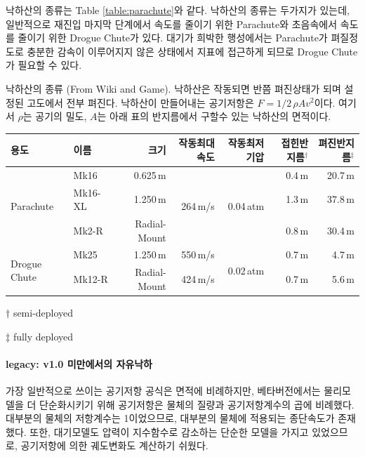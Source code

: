 \documentclass[9pt]{amsbook}
\begin{document}
낙하산의 종류는 Table \ref{table:parachute}와 같다. 낙하산의 종류는 두가지가 있는데, 일반적으로 재진입 마지막 단계에서 속도를 줄이기 위한 Parachute와 초음속에서 속도를 줄이기 위한 Drogue Chute가 있다. 대기가 희박한 행성에서는 Parachute가 펴질정도로 충분한 감속이 이루어지지 않은 상태에서 지표에 접근하게 되므로 Drogue Chute가 필요할 수 있다.

\begin{center}
\begin{adjustbox}{width=\textwidth}
\begin{threeparttable}
\caption{
낙하산의 종류
(From Wiki and Game). 
낙하산은 작동되면 반쯤 펴진상태가 되며 설정된 고도에서 전부 펴진다. 
낙하산이 만들어내는 공기저항은 $F = 1/2 \,\rho A v^2$이다. 
여기서 $\rho$는 공기의 밀도, $A$는 아래 표의 반지름에서 구할수 있는 낙하산의 면적이다.}
\label{table:parachute}
\begin{tabular}{|l|l|r|r|r|r|r|}
\hline
용도&이름&크기&작동최대속도&작동최저기압&접힌반지름$^\dagger$&펴진반지름$^\ddagger$
\\\hline
\multirow{3}{*}{Parachute}&Mk16&0.625\,m&\multirow{3}{*}{264\,m/s}&\multirow{3}{*}{0.04\,atm}
&0.4\,m&20.7\,m
\\
&Mk16-XL&1.250\,m&&&1.3\,m&37.8\,m
\\
&Mk2-R &Radial-Mount&&&0.8\,m&30.4\,m
\\\hline
\multirow{2}{*}{Drogue Chute}&Mk25&1.250\,m&550\,m/s&\multirow{2}{*}{0.02\,atm}&0.7\,m&4.7\,m
\\
&Mk12-R &Radial-Mount&424\,m/s&&0.7\,m&5.6\,m
\\\hline
\end{tabular}
\begin{tablenotes}
\item[$\dagger$] semi-deployed
\item[$\ddagger$] fully deployed
\end{tablenotes}
\end{threeparttable}
\end{adjustbox}
\end{center}


\paragraph{legacy: v1.0 미만에서의 자유낙하}
가장 일반적으로 쓰이는 공기저항 공식은 면적에 비례하지만, 
베타버전에서는 물리모델을 더 단순화시키기 위해 공기저항은 물체의 질량과 공기저항계수의 곱에 비례했다.
대부분의 물체의 저항계수는 1이었으므로,
대부분의 물체에 적용되는 종단속도가 존재했다.
또한, 대기모델도 압력이 지수함수로 감소하는 단순한 모델을 가지고 있었으므로,
공기저항에 의한 궤도변화도 계산하기 쉬웠다.
\end{document}
